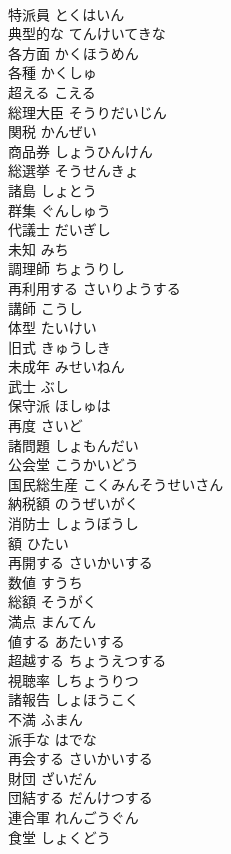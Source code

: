 \documentclass[8pt]{extreport}
\begin{document}
\begin{CJK}{UTF8}{min}
\\	特派員	とくはいん	
\\	典型的な	てんけいてきな	
\\	各方面	かくほうめん	
\\	各種	かくしゅ	
\\	超える	こえる	
\\	総理大臣	そうりだいじん	
\\	関税	かんぜい	
\\	商品券	しょうひんけん	
\\	総選挙	そうせんきょ	
\\	諸島	しょとう	
\\	群集	ぐんしゅう	
\\	代議士	だいぎし	
\\	未知	みち	
\\	調理師	ちょうりし	
\\	再利用する	さいりようする	
\\	講師	こうし	
\\	体型	たいけい	
\\	旧式	きゅうしき	
\\	未成年	みせいねん	
\\	武士	ぶし	
\\	保守派	ほしゅは	
\\	再度	さいど	
\\	諸問題	しょもんだい	
\\	公会堂	こうかいどう	
\\	国民総生産	こくみんそうせいさん	
\\	納税額	のうぜいがく	
\\	消防士	しょうぼうし	
\\	額	ひたい	
\\	再開する	さいかいする	
\\	数値	すうち	
\\	総額	そうがく	
\\	満点	まんてん	
\\	値する	あたいする	
\\	超越する	ちょうえつする	
\\	視聴率	しちょうりつ	
\\	諸報告	しょほうこく	
\\	不満	ふまん	
\\	派手な	はでな	
\\	再会する	さいかいする	
\\	財団	ざいだん	
\\	団結する	だんけつする	
\\	連合軍	れんごうぐん	
\\	食堂	しょくどう	

\end{CJK}
\end{document}
